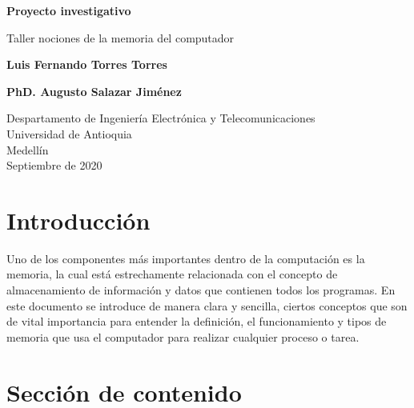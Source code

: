 \documentclass{article}
\begin{document}
\begin{titlepage}
    \begin{center}
        \vspace*{1cm}
            
        \Huge
        \textbf{Proyecto investigativo}
        
            
        \vspace{0.5cm}
        \LARGE
        Taller nociones de la memoria del computador
            
        \vspace{1.5cm}
            
        \textbf{Luis Fernando Torres Torres}
        
        \vspace{4cm}
            
        \textbf{PhD. Augusto Salazar Jiménez}
            
        \vfill
            
        \vspace{0.8cm}
            
        \Large
        Despartamento de Ingeniería Electrónica y Telecomunicaciones\\
        Universidad de Antioquia\\
        Medellín\\
        Septiembre de 2020
            
    \end{center}
\end{titlepage}

\tableofcontents%

\newpage

\section{Introducción}\label{intro}
Uno de los componentes más importantes dentro de la computación es la memoria, la cual está estrechamente relacionada con el concepto de almacenamiento de información y datos que contienen todos los programas. En este documento se introduce de manera clara y sencilla, ciertos conceptos que son de vital importancia para entender la definición, el funcionamiento y tipos de memoria que usa el computador para realizar cualquier proceso o tarea.

\section{Sección de contenido}
\end{document}
